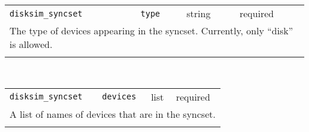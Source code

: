\noindent 
\begin{tabular}{|p{\lpmodwidth}|p{\lpnamewidth}|p{0.5in}|p{0.5in}|}
\cline{1-4}
\texttt{disksim\_syncset} & \texttt{type} & string & required \\ 
\cline{1-4}
\multicolumn{4}{|p{6in}|}{
The type of devices appearing in the syncset. Currently, only
``disk'' is allowed.
}\\ 
\cline{1-4}
\multicolumn{4}{p{5in}}{}\\
\end{tabular}\\ 
\noindent 
\begin{tabular}{|p{\lpmodwidth}|p{\lpnamewidth}|p{0.5in}|p{0.5in}|}
\cline{1-4}
\texttt{disksim\_syncset} & \texttt{devices} & list & required \\ 
\cline{1-4}
\multicolumn{4}{|p{6in}|}{
A list of names of devices that are in the syncset.
}\\ 
\cline{1-4}
\multicolumn{4}{p{5in}}{}\\
\end{tabular}\\ 
